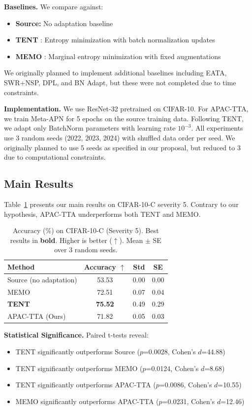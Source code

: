 \documentclass{article}
\begin{document}
\textbf{Baselines.} We compare against:
\begin{itemize}
    \item \textbf{Source:} No adaptation baseline
    \item \textbf{TENT} \citep{wang2021tent}: Entropy minimization with batch normalization updates
    \item \textbf{MEMO} \citep{zhang2022memo}: Marginal entropy minimization with fixed augmentations
\end{itemize}
We originally planned to implement additional baselines including EATA, SWR+NSP, DPL, and BN Adapt, but these were not completed due to time constraints.

\textbf{Implementation.} We use ResNet-32 pretrained on CIFAR-10. For APAC-TTA, we train Meta-APN for 5 epochs on the source training data. Following TENT, we adapt only BatchNorm parameters with learning rate $10^{-3}$. All experiments use 3 random seeds (2022, 2023, 2024) with shuffled data order per seed. We originally planned to use 5 seeds as specified in our proposal, but reduced to 3 due to computational constraints.

\subsection{Main Results}

Table~\ref{tab:main_results} presents our main results on CIFAR-10-C severity 5. Contrary to our hypothesis, APAC-TTA underperforms both TENT and MEMO.

\begin{table}[t]
\caption{Accuracy (\%) on CIFAR-10-C (Severity 5). Best results in \textbf{bold}. Higher is better ($\uparrow$). Mean $\pm$ SE over 3 random seeds.}
\label{tab:main_results}
\centering
\begin{tabular}{lccc}
\toprule
Method & Accuracy $\uparrow$ & Std & SE \\
\midrule
Source (no adaptation) & 53.53 & 0.00 & 0.00 \\
MEMO \citep{zhang2022memo} & 72.51 & 0.07 & 0.04 \\
\textbf{TENT} \citep{wang2021tent} & \textbf{75.52} & 0.49 & 0.29 \\
APAC-TTA (Ours) & 71.82 & 0.05 & 0.03 \\
\bottomrule
\end{tabular}
\end{table}

\textbf{Statistical Significance.} Paired t-tests reveal:
\begin{itemize}
    \item TENT significantly outperforms Source ($p$=0.0028, Cohen's $d$=44.88)
    \item TENT significantly outperforms MEMO ($p$=0.0124, Cohen's $d$=8.68)
    \item TENT significantly outperforms APAC-TTA ($p$=0.0086, Cohen's $d$=10.55)
    \item MEMO significantly outperforms APAC-TTA ($p$=0.0231, Cohen's $d$=12.46)
\end{itemize}
\end{document}
